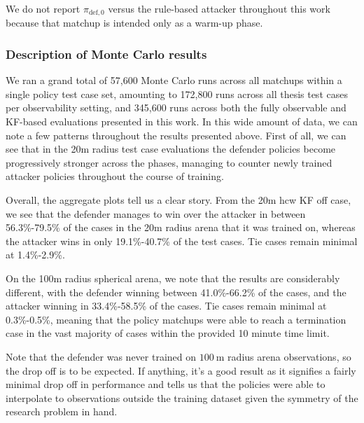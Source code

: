 We do not report {\boldmath\textbf{$\pi_{\mathrm{def},0}$}} versus the rule-based attacker throughout this work because that matchup is intended only as a warm-up phase.




\subsubsection{Description of Monte Carlo results}
\label{sec:mc_results_description}



We ran a grand total of 57,600 Monte Carlo runs across all matchups within a single policy test case set, amounting to 172,800 runs across all thesis test cases per observability setting, and 345,600 runs across both the fully observable and KF-based evaluations presented in this work. In this wide amount of data, we can note a few patterns throughout the results presented above. First of all, we can see that in the 20m radius test case evaluations the defender policies become progressively stronger across the phases, managing to counter newly trained attacker policies throughout the course of training.

Overall, the aggregate plots tell us a clear story. From the 20m \acs{hcw} KF off case, we see that the defender manages to win over the attacker in between 56.3\%-79.5\% of the cases in the 20m radius arena that it was trained on, whereas the attacker wins in only 19.1\%-40.7\% of the test cases. Tie cases remain minimal at 1.4\%-2.9\%.

On the 100m radius spherical arena, we note that the results are considerably different, with the defender winning between 41.0\%-66.2\% of the cases, and the attacker winning in 33.4\%-58.5\% of the cases. Tie cases remain minimal at 0.3\%-0.5\%, meaning that the policy matchups were able to reach a termination case in the vast majority of cases within the provided 10 minute time limit.


Note that the defender was never trained on $100~\mathrm{m}$ radius arena observations, so the drop off is to be expected. If anything, it's a good result as it signifies a fairly minimal drop off in performance and tells us that the policies were able to interpolate to observations outside the training dataset given the symmetry of the research problem in hand.

